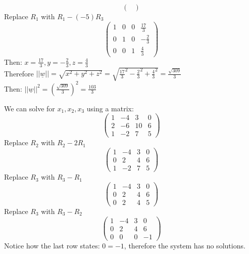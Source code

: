 \documentclass{article}
\begin{document}
\begin{homeworkProblem}
$$\begin{pmatrix}
        \end{pmatrix}$$
    Replace $R_1$ with $R_1 - (-5)R_3$
    $$\begin{pmatrix}
            1 & 0 & 0 & \frac{17}{3} \\
            0 & 1 & 0 & -\frac{2}{3} \\
            0 & 0 & 1 & \frac{4}{3}
        \end{pmatrix}$$
    Then: $x = \frac{17}{3}, y = -\frac{2}{3}, z = \frac{4}{3}$\\
    Therefore $||\underline{w}|| = \sqrt{x^2 + y^2 + z^2} = \sqrt{\frac{17}{3}^2 - \frac{2}{3}^2 + \frac{4}{3}^2} = \frac{\sqrt{309}}{3}$\\
    Then: $||\underline{w}||^2 = (\frac{\sqrt{309}}{3})^2 = \frac{103}{3}$
\end{homeworkProblem}
\begin{homeworkProblem}
    \solution
    We can solve for $x_1, x_2, x_3$ using a matrix:
    $$\begin{pmatrix}
            1 & -4 & 3  & 0 \\
            2 & -6 & 10 & 6 \\
            1 & -2 & 7  & 5
        \end{pmatrix}$$
    Replace $R_2$ with $R_2 - 2R_1$
    $$\begin{pmatrix}
            1 & -4 & 3 & 0 \\
            0 & 2  & 4 & 6 \\
            1 & -2 & 7 & 5
        \end{pmatrix}$$
    Replace $R_3$ with $R_3 - R_1$
    $$\begin{pmatrix}
            1 & -4 & 3 & 0 \\
            0 & 2  & 4 & 6 \\
            0 & 2  & 4 & 5
        \end{pmatrix}$$
    Replace $R_3$ with $R_3 - R_2$
    $$\begin{pmatrix}
            1 & -4 & 3 & 0  \\
            0 & 2  & 4 & 6  \\
            0 & 0  & 0 & -1
        \end{pmatrix}$$
    Notice how the last row states: $0 = -1$, therefore the system has no solutions.
\end{homeworkProblem}
\end{document}
